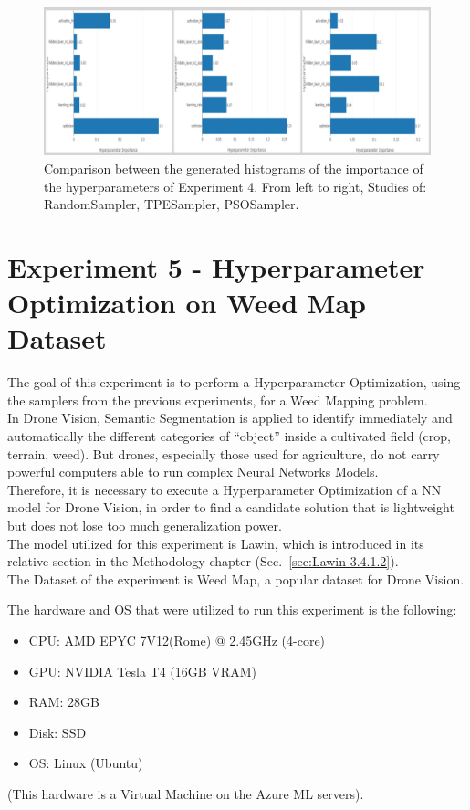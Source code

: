 \begin{figure}[t]
	\centering
	\includegraphics[width=15cm]{figures/figure-4.4.1.png}
	\caption[Hyperparameters Importance Histograms Experiment 4]{Comparison between the generated histograms of the importance of the hyperparameters of Experiment 4. From left to right, Studies of: RandomSampler, TPESampler, PSOSampler.}
	\label{fig:figure-4.4.1}
\end{figure}

\section[Experiment 5 - HPO on Weed Map Dataset]{Experiment 5 - Hyperparameter Optimization on Weed Map Dataset}

The goal of this experiment is to perform a Hyperparameter Optimization, using the samplers from the previous experiments, for a Weed Mapping problem.
\\[0.3cm]In Drone Vision, Semantic Segmentation is applied to identify immediately and automatically the different categories of “object” inside a cultivated field (crop, terrain, weed). But drones, especially those used for agriculture, do not carry powerful computers able to run complex Neural Networks Models.
\\[0.3cm]Therefore, it is necessary to execute a Hyperparameter Optimization of a NN model for Drone Vision, in order to find a candidate solution that is lightweight but does not lose too much generalization power.
\\[0.3cm]The model utilized for this experiment is Lawin, which is introduced in its relative section in the Methodology chapter (Sec.~\ref{sec:Lawin-3.4.1.2}).
\\[0.3cm]The Dataset of the experiment is Weed Map, a popular dataset for Drone Vision.

The hardware and OS that were utilized to run this experiment is the following:
\begin{itemize}[itemsep=0.1cm]
	\item CPU: AMD EPYC 7V12(Rome) @ 2.45GHz (4-core)
	\item GPU: NVIDIA Tesla T4 (16GB VRAM)
	\item RAM: 28GB
	\item Disk: SSD
	\item OS: Linux (Ubuntu)
\end{itemize}
(This hardware is a Virtual Machine on the Azure ML servers).

